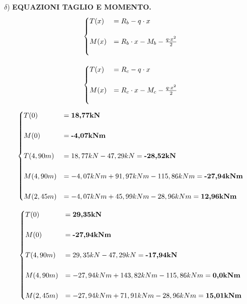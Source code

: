 \documentclass[a4paper,12pt, oneside]{book}
\begin{document}
    \break
    
    $\delta$) \textbf{EQUAZIONI TAGLIO E MOMENTO.}
    \leavevmode\newline
    \leavevmode\newline
    \phantom{testoabcdefgh}{\tiny TRATTO B-C}
    \begin{equation}
    	\begin{cases}
    	T(x)&=R_b-q\cdot x \\ \\
        M(x)&=R_b\cdot x-M_b-\frac{q\cdot x^2}{2}\\ \\ 
    	\end{cases}
    	\hfill
    \end{equation}

    \phantom{testoabcdefgh}{\tiny TRATTO C-D}
    \begin{equation}
    	\begin{cases}
    		T(x)&=R_c-q\cdot x \\ \\
    		M(x)&=R_c\cdot x-M_c-\frac{q\cdot x^2}{2}\\ \\ 
    	\end{cases}
    	\hfill
    \end{equation}
    \leavevmode\newline
    \leavevmode\newline
    \leavevmode\newline
    \phantom{tes}{\tiny TRATTO B-C}
    \begin{equation}
    	\begin{cases}
    		T(0)&=\textbf{18,77kN} \\ \\
    		M(0)&=\textbf{-4,07kNm}\\ \\ 
    		T(4,90m)&=18,77kN-47,29kN=\textbf{-28,52kN}\\ \\ 
    		M(4,90m)&=-4,07kNm+91,97kNm-115,86kNm=\textbf{-27,94kNm}\\ \\ 
    		M(2,45m)&=-4,07kNm+45,99kNm-28,96kNm=\textbf{12,96kNm}
    	\end{cases}
    	\hfill
    \end{equation}
    
    \phantom{tes}{\tiny TRATTO C-D}
    \begin{equation}
    	\begin{cases}
    		T(0)&=\textbf{29,35kN} \\ \\
    		M(0)&=\textbf{-27,94kNm}\\ \\ 
    		T(4,90m)&=29,35kN-47,29kN=\textbf{-17,94kN}\\ \\ 
    		M(4,90m)&=-27,94kNm+143,82kNm-115,86kNm=\textbf{0,0kNm}\\ \\ 
    		M(2,45m)&=-27,94kNm+71,91kNm-28,96kNm=\textbf{15,01kNm}
    	\end{cases}
    	\hfill
    \end{equation}
    
\end{document}
